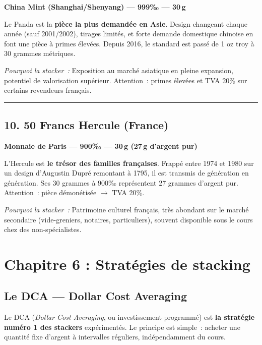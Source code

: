 \documentclass[14pt,a4paper]{extarticle}
\newcommand{\permil}{‰}
\newcommand{\goldsep}{%
  \begin{center}
    \textcolor{gold}{\rule{6cm}{0.4pt}}
  \end{center}
}
\begin{document}
\textbf{China Mint (Shanghai/Shenyang) --- 999\permil{} --- 30\,g}

Le Panda est la \textbf{pièce la plus demandée en Asie}. Design changeant chaque année (sauf 2001/2002), tirages limités, et forte demande domestique chinoise en font une pièce à primes élevées. Depuis 2016, le standard est passé de 1 oz troy à 30 grammes métriques.

\textit{Pourquoi la stacker~:} Exposition au marché asiatique en pleine expansion, potentiel de valorisation supérieur. Attention~: primes élevées et TVA 20\% sur certains revendeurs français.

\goldsep

\subsection{10. 50 Francs Hercule (France)}

\textbf{Monnaie de Paris --- 900\permil{} --- 30\,g (27\,g d'argent pur)}

L'Hercule est \textbf{le trésor des familles françaises}. Frappé entre 1974 et 1980 sur un design d'Augustin Dupré remontant à 1795, il est transmis de génération en génération. Ses 30 grammes à 900\permil{} représentent 27 grammes d'argent pur. Attention~: pièce démonétisée $\rightarrow$ TVA 20\%.

\textit{Pourquoi la stacker~:} Patrimoine culturel français, très abondant sur le marché secondaire (vide-greniers, notaires, particuliers), souvent disponible sous le cours chez des non-spécialistes.


\newpage

\section{Chapitre 6 : Stratégies de stacking}

\subsection{Le DCA --- Dollar Cost Averaging}

Le DCA (\textit{Dollar Cost Averaging}, ou investissement programmé) est \textbf{la stratégie numéro 1 des stackers} expérimentés. Le principe est simple~: acheter une quantité fixe d'argent à intervalles réguliers, indépendamment du cours.
\end{document}
